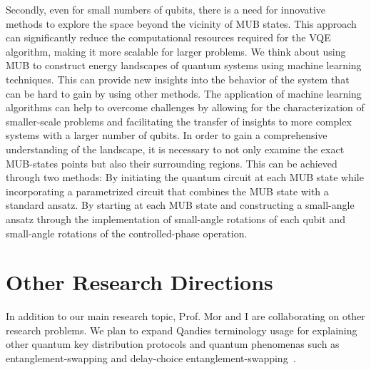 \documentclass[12pt, a4paper]{article}
\begin{document}
    Secondly, even for small numbers of qubits, there is a need for innovative methods to explore the space beyond the
    vicinity of MUB states.
    This approach can significantly reduce the computational resources required for the VQE algorithm,
    making it more scalable for larger problems.
    We think about using MUB to construct energy landscapes of quantum systems using machine learning techniques.
    This can provide new insights into the behavior of the system that can be hard to gain by using other methods.
    The application of machine learning algorithms can help to overcome challenges by allowing for the
    characterization of smaller-scale problems and facilitating the transfer of insights to more complex systems with a
    larger number of qubits.
    In order to gain a comprehensive understanding of the landscape, it is necessary to not only examine the exact
    MUB-states points but also their surrounding regions.
    This can be achieved through two methods:
    By initiating the quantum circuit at each MUB state while incorporating a parametrized circuit that combines the MUB state
    with a standard ansatz.
    By starting at each MUB state and constructing a small-angle ansatz through the implementation of small-angle
    rotations of each qubit and small-angle rotations of the controlled-phase operation.


    \section{Other Research Directions}\label{sec:other-research-directions}
    In addition to our main research topic, Prof. Mor and I are collaborating on other research problems.
    We plan to expand Qandies \cite{lin2020quantum} \cite{lin2021quantum} \cite{mor2022digital} terminology
    usage for explaining other quantum key distribution protocols and quantum phenomenas such as
    entanglement-swapping and delay-choice entanglement-swapping~\cite{ma2016delayed}.

    
    
\end{document}
